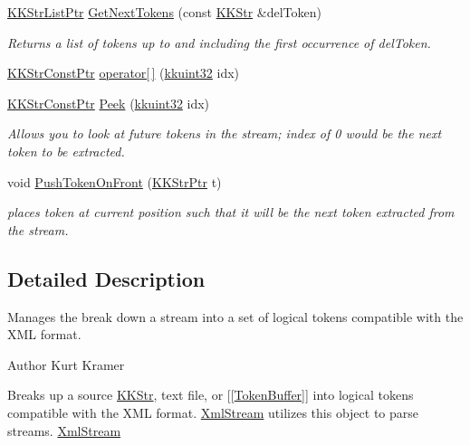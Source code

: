 \begin{DoxyCompactItemize}
\hyperlink{namespace_k_k_b_a8f5f50672f37857425120831223888aa}{K\+K\+Str\+List\+Ptr} \hyperlink{class_k_k_b_1_1_xml_tokenizer_aa2fc95e3586432a1bfbf53a9cda220fc}{Get\+Next\+Tokens} (const \hyperlink{class_k_k_b_1_1_k_k_str}{K\+K\+Str} \&del\+Token)
\begin{DoxyCompactList}\small\item\em Returns a list of tokens up to and including the first occurrence of \textquotesingle{}del\+Token\textquotesingle{}. \end{DoxyCompactList}\item 
\hyperlink{namespace_k_k_b_a46f665ec17615c856eff3d21f78bed5c}{K\+K\+Str\+Const\+Ptr} \hyperlink{class_k_k_b_1_1_xml_tokenizer_ac32d8e07df09d1f801b265d7f7ec05ac}{operator\mbox{[}$\,$\mbox{]}} (\hyperlink{namespace_k_k_b_af8d832f05c54994a1cce25bd5743e19a}{kkuint32} idx)
\item 
\hyperlink{namespace_k_k_b_a46f665ec17615c856eff3d21f78bed5c}{K\+K\+Str\+Const\+Ptr} \hyperlink{class_k_k_b_1_1_xml_tokenizer_ad92283e9dae249290073a98c0c6c525c}{Peek} (\hyperlink{namespace_k_k_b_af8d832f05c54994a1cce25bd5743e19a}{kkuint32} idx)
\begin{DoxyCompactList}\small\item\em Allows you to look at future tokens in the stream; index of 0 would be the next token to be extracted. \end{DoxyCompactList}\item 
void \hyperlink{class_k_k_b_1_1_xml_tokenizer_a6cbfa15f710ef5de797b6ac48c0ad57f}{Push\+Token\+On\+Front} (\hyperlink{namespace_k_k_b_a9adbef5a6b3be0867f5570df2a08f388}{K\+K\+Str\+Ptr} t)
\begin{DoxyCompactList}\small\item\em places token at current position such that it will be the next token extracted from the stream. \end{DoxyCompactList}\end{DoxyCompactItemize}


\subsection{Detailed Description}
Manages the break down a stream into a set of logical tokens compatible with the X\+ML format. 

\begin{DoxyAuthor}{Author}
Kurt Kramer
\end{DoxyAuthor}
Breaks up a source \hyperlink{class_k_k_b_1_1_k_k_str}{K\+K\+Str}, text file, or \mbox{[}\mbox{[}\hyperlink{class_k_k_b_1_1_token_buffer}{Token\+Buffer}\mbox{]}\mbox{]} into logical tokens compatible with the X\+ML format. \hyperlink{class_k_k_b_1_1_xml_stream}{Xml\+Stream} utilizes this object to parse streams. \hyperlink{class_k_k_b_1_1_xml_stream}{Xml\+Stream} 

